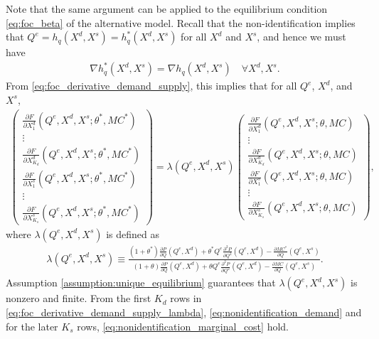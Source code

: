 \documentclass[11pt, a4paper]{article}
\theoremstyle{remark}
\begin{document}
Note that the same argument can be applied to the equilibrium condition \eqref{eq:foc_beta} of the alternative model.
Recall that the non-identification implies that $Q^e = h_q(X^{d}, X^{s}) = h_q^{*}(X^{d}, X^{s})$ for all $X^{d}$ and $X^{s}$, and hence we must have
\begin{align}
    \nabla h_q^{*}(X^{d}, X^{s}) = \nabla h_q(X^{d}, X^{s}) \quad \forall X^{d}, X^{s}. \label{eq:observale_equivalence_derivative}
\end{align}
From \eqref{eq:foc_derivative_demand_supply}, this implies that for all $Q^e$, $X^{d}$, and $X^{s}$,
\begin{align}
    \begin{pmatrix}
        \frac{\partial F}{\partial X^{d}_{1}}(Q^e, X^{d}, X^{s}; \theta^{*}, MC^{*})\\
        \vdots \\
        \frac{\partial F}{\partial X^{d}_{K_d}}(Q^e, X^{d}, X^{s}; \theta^{*}, MC^{*})\\
        \frac{\partial F}{\partial X^{s}_{1}}(Q^e, X^{d}, X^{s}; \theta^{*}, MC^{*})\\
        \vdots \\
        \frac{\partial F}{\partial X^{s}_{K_s}}(Q^e, X^{d}, X^{s}; \theta^{*}, MC^{*})
    \end{pmatrix}
    = \lambda(Q^e, X^{d}, X^{s})
    \begin{pmatrix}
        \frac{\partial F}{\partial X^{d}_{1}}(Q^e, X^{d}, X^{s}; \theta, MC)\\
        \vdots \\
        \frac{\partial F}{\partial X^{d}_{K_d}}(Q^e, X^{d}, X^{s}; \theta, MC)\\
        \frac{\partial F}{\partial X^{s}_{1}}(Q^e, X^{d}, X^{s}; \theta, MC)\\
        \vdots \\
        \frac{\partial F}{\partial X^{s}_{K_s}}(Q^e, X^{d}, X^{s}; \theta, MC)
    \end{pmatrix},\label{eq:foc_derivative_demand_supply_lambda}
\end{align}
where $\lambda(Q^e, X^{d}, X^{s})$ is defined as
\begin{align}
    \lambda(Q^e, X^{d}, X^{s}) \equiv \frac{(1+\theta^{*})\frac{\partial P}{\partial Q}(Q^e, X^{d}) + \theta^{*} Q^e\frac{\partial^2 P}{\partial Q^2}(Q^e, X^{d}) - \frac{\partial MC^{*}}{\partial Q}(Q^e, X^{s})}{(1+\theta)\frac{\partial P}{\partial Q}(Q^e, X^{d}) + \theta Q^e\frac{\partial^2 P}{\partial Q^2}(Q^e, X^{d}) - \frac{\partial MC}{\partial Q}(Q^e, X^{s})}.
\end{align}
Assumption \ref{assumption:unique_equilibrium} guarantees that $\lambda(Q^e, X^{d}, X^{s})$ is nonzero and finite.
From the first $K_d$ rows in \eqref{eq:foc_derivative_demand_supply_lambda}, \eqref{eq:nonidentification_demand} and for the later $K_s$ rows, \eqref{eq:nonidentification_marginal_cost} hold.
\end{document}
